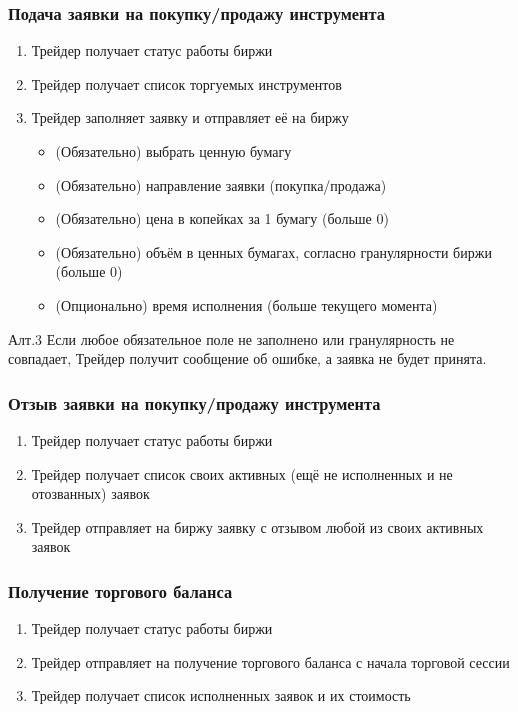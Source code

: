 \documentclass[a4paper, 12pt]{article}        %
\begin{document}
\subsubsection{Подача заявки на покупку/продажу инструмента}

\begin{enumerate}
\item Трейдер получает статус работы биржи
\item Трейдер получает список торгуемых инструментов
\item Трейдер заполняет заявку и отправляет её на биржу
\begin{itemize}
\item (Обязательно) выбрать ценную бумагу
\item (Обязательно) направление заявки (покупка/продажа)
\item (Обязательно) цена в копейках за 1 бумагу (больше 0)
\item (Обязательно) объём в ценных бумагах, согласно гранулярности биржи (больше 0)
\item (Опционально) время исполнения (больше текущего момента)
\end{itemize}
\end{enumerate}

Алт.3 Если любое обязательное поле не заполнено или гранулярность не совпадает, Трейдер получит сообщение об ошибке, а заявка не будет принята.

\subsubsection{Отзыв заявки на покупку/продажу инструмента}

\begin{enumerate}
\item Трейдер получает статус работы биржи
\item Трейдер получает список своих активных (ещё не исполненных и не отозванных) заявок
\item Трейдер отправляет на биржу заявку с отзывом любой из своих активных заявок
\end{enumerate}

\subsubsection{Получение торгового баланса}

\begin{enumerate}
\item Трейдер получает статус работы биржи
\item Трейдер отправляет на получение торгового баланса с начала торговой сессии
\item Трейдер получает список исполненных заявок и их стоимость
\end{enumerate}
\end{document}
